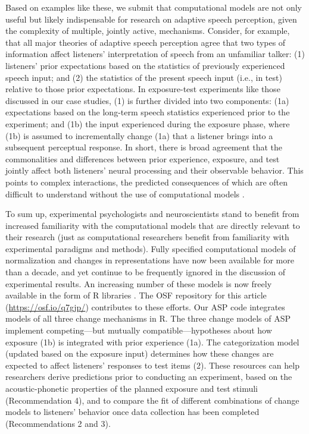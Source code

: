 \documentclass[
  11pt,
  man,floatsintext]{apa6}
\begin{document}
Based on examples like these, we submit that computational models are not only useful but likely indispensable for research on adaptive speech perception, given the complexity of multiple, jointly active, mechanisms. Consider, for example, that all major theories of adaptive speech perception agree that two types of information affect listeners' interpretation of speech from an unfamiliar talker: (1) listeners' prior expectations based on the statistics of previously experienced speech input; and (2) the statistics of the present speech input (i.e., in test) relative to those prior expectations. In exposure-test experiments like those discussed in our case studies, (1) is further divided into two components: (1a) expectations based on the long-term speech statistics experienced prior to the experiment; and (1b) the input experienced during the exposure phase, where (1b) is assumed to incrementally change (1a) that a listener brings into a subsequent perceptual response. In short, there is broad agreement that the commonalities and differences between prior experience, exposure, and test jointly affect both listeners' neural processing and their observable behavior. This points to complex interactions, the predicted consequences of which are often difficult to understand without the use of computational models \autocites[for further examples and discussion, see][]{apfelbaum-mcmurray2015,sohoglu-davis2016,tan2021,theodore-monto2019,toscano2018,xie2021cognition}.

To sum up, experimental psychologists and neuroscientists stand to benefit from increased familiarity with the computational models that are directly relevant to their research (just as computational researchers benefit from familiarity with experimental paradigms and methods). Fully specified computational models of normalization and changes in representations have now been available for more than a decade, and yet continue to be frequently ignored in the discussion of experimental results. An increasing number of these models is now freely available in the form of R libraries \autocites[e.g., for normalization: \texttt{phonTools},][]{barreda2015}[for changes in category representations: \texttt{beliefupdatr} and its extension \texttt{MVBeliefUpdatr},][]{kleinschmidt-jaeger2015}. The OSF repository for this article (\url{https://osf.io/q7gjp/}) contributes to these efforts. Our ASP code integrates models of all three change mechanisms in R. The three change models of ASP implement competing---but mutually compatible---hypotheses about how exposure (1b) is integrated with prior experience (1a). The categorization model (updated based on the exposure input) determines how these changes are expected to affect listeners' responses to test items (2). These resources can help researchers derive predictions prior to conducting an experiment, based on the acoustic-phonetic properties of the planned exposure and test stimuli (Recommendation 4), and to compare the fit of different combinations of change models to listeners' behavior once data collection has been completed (Recommendations 2 and 3).
\end{document}

